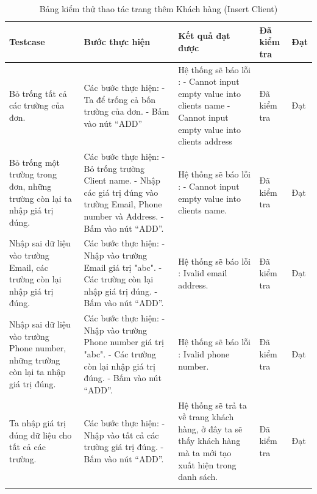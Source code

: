 \documentclass{article}
\begin{document}
\begin{longtable}{ | p{} |p{} | p{}  | p{}  | p{}  | } 
\hline
\textbf{Testcase}& \textbf{Bước thực hiện}& \textbf{Kết quả đạt được} & \textbf{Đã kiểm tra}& \textbf{Đạt} \\ 
\hline
\hline
Bỏ trống tất cả các trường của đơn. &
Các bước thực hiện: \newline
- Ta để trống cả bốn trường của đơn. \newline
- Bấm vào nút “ADD”
&
Hệ thống sẽ báo lỗi :  \newline
- Cannot input empty value into clients name \newline
- Cannot input empty value into clients address
&
Đã kiểm tra &
Đạt \\

\hline
Bỏ trống một trường trong đơn, những trường còn lại ta nhập giá trị đúng. &
Các bước thực hiện: \newline
- Bỏ trống trường Client name.  \newline
- Nhập các giá trị đúng vào trường Email, Phone number và Address.  \newline
- Bấm vào nút “ADD”.
&
Hệ thống sẽ báo lỗi :  \newline
- Cannot input empty value into clients name.
&
Đã kiểm tra &
Đạt \\

\hline
Nhập sai dữ liệu vào trường Email, các trường còn lại nhập giá trị đúng. &
Các bước thực hiện: \newline
- Nhập vào trường Email giá trị  "abc". \newline
- Các trường còn lại nhập giá trị đúng.  \newline
- Bấm vào nút “ADD”.
&
Hệ thống sẽ báo lỗi : Ivalid email address.
&
Đã kiểm tra &
Đạt \\

\hline
Nhập sai dữ liệu vào trường Phone number, những trường còn lại ta nhập giá trị đúng. &
Các bước thực hiện: \newline
- Nhập vào trường Phone number giá trị  "abc". \newline
- Các trường còn lại nhập giá trị đúng.  \newline
- Bấm vào nút “ADD”.
&
Hệ thống sẽ báo lỗi : Ivalid phone number.
&
Đã kiểm tra &
Đạt \\

\hline
Ta nhập giá trị đúng dữ liệu cho tất cả các trường. &
Các bước thực hiện: \newline
- Nhập vào tất cả các trường giá trị đúng. \newline
- Bấm vào nút “ADD”.
&
Hệ thống sẽ trả ta về trang khách hàng, ở đây ta sẽ thấy khách hàng mà ta mới tạo xuất hiện trong danh sách.
&
Đã kiểm tra &
Đạt \\

\hline
\caption{Bảng kiểm thử thao tác trang thêm Khách hàng (Insert Client)}
\end{longtable}
\end{document}
